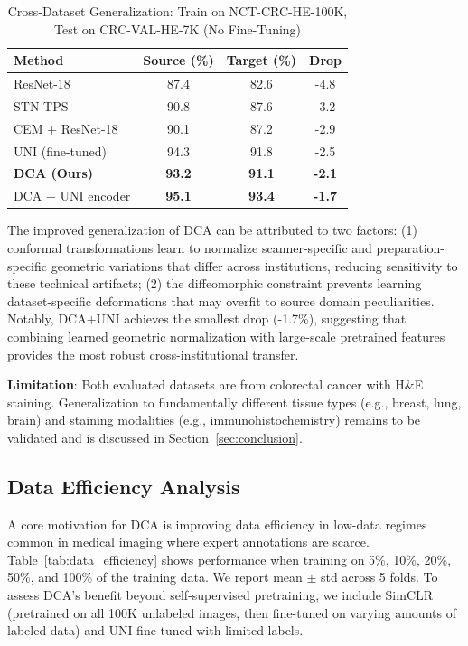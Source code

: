 \documentclass[10pt,journal,compsoc]{IEEEtran}
\begin{document}
\begin{table}[t]
\centering
\caption{Cross-Dataset Generalization: Train on NCT-CRC-HE-100K, Test on CRC-VAL-HE-7K (No Fine-Tuning)}
\label{tab:generalization}
\begin{tabular}{lccc}
\hline
\textbf{Method} & \textbf{Source (\%)} & \textbf{Target (\%)} & \textbf{Drop} \\
\hline
ResNet-18 & 87.4 & 82.6 & -4.8 \\
STN-TPS & 90.8 & 87.6 & -3.2 \\
CEM + ResNet-18 & 90.1 & 87.2 & -2.9 \\
UNI (fine-tuned) & 94.3 & 91.8 & -2.5 \\
\textbf{DCA (Ours)} & \textbf{93.2} & \textbf{91.1} & \textbf{-2.1} \\
DCA + UNI encoder & \textbf{95.1} & \textbf{93.4} & \textbf{-1.7} \\
\hline
\end{tabular}
\end{table}

The improved generalization of DCA can be attributed to two factors: (1) conformal transformations learn to normalize scanner-specific and preparation-specific geometric variations that differ across institutions, reducing sensitivity to these technical artifacts; (2) the diffeomorphic constraint prevents learning dataset-specific deformations that may overfit to source domain peculiarities. Notably, DCA+UNI achieves the smallest drop (-1.7\%), suggesting that combining learned geometric normalization with large-scale pretrained features provides the most robust cross-institutional transfer.

\textbf{Limitation}: Both evaluated datasets are from colorectal cancer with H\&E staining. Generalization to fundamentally different tissue types (e.g., breast, lung, brain) and staining modalities (e.g., immunohistochemistry) remains to be validated and is discussed in Section~\ref{sec:conclusion}.

\subsection{Data Efficiency Analysis}
\label{sec:data_efficiency}

A core motivation for DCA is improving data efficiency in low-data regimes common in medical imaging where expert annotations are scarce. Table~\ref{tab:data_efficiency} shows performance when training on 5\%, 10\%, 20\%, 50\%, and 100\% of the training data. We report mean $\pm$ std across 5 folds. To assess DCA's benefit beyond self-supervised pretraining, we include SimCLR (pretrained on all 100K unlabeled images, then fine-tuned on varying amounts of labeled data) and UNI fine-tuned with limited labels.
\end{document}
